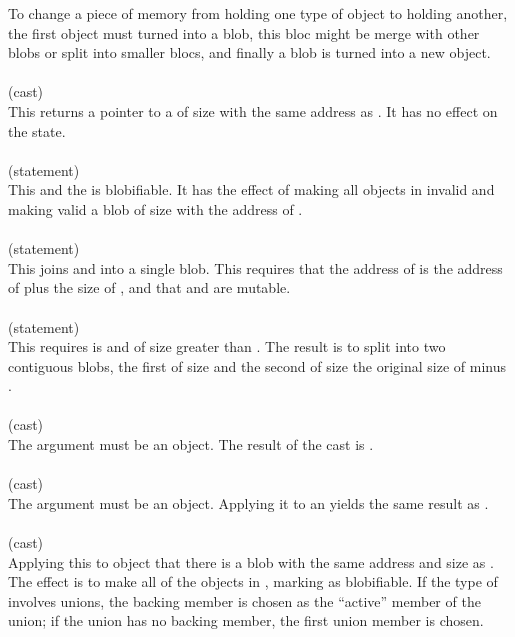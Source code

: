 \documentclass[preprint,nocopyrightspace]{sigplanconf}
\begin{document}
{{{{To change a piece of memory from holding one type of object to holding
another, the first object must turned into a blob, this bloc might be 
merge with other blobs or split into smaller blocs, and finally a blob
is turned into a new object. 
\\\\
 (cast)\\
This returns a pointer to a  of size  with the same
address as . It has no effect on the state. 
\\\\
 (statement)\\
This    and
the \vcc{\object} is blobifiable. It has the effect of making all
objects in  invalid and making valid a blob of
size  with the address of .
\\\\ 
 (statement)\\
This joins  and  into a single blob. This requires that
the address of  is the address of  plus the size
of , and that  and  are mutable.
\\\\
 (statement)\\
This requires  is \vcc{\mutable} and of size greater
than . The result is to split  into two contiguous
blobs, the first of size  and the second of size the original
size of  minus .
\\\\
 (cast) \\
The argument must be an object.
The result of the cast is .
\\\\
 (cast)\\
The argument must be an object.
Applying it to an  yields
the same result as .
\\\\
 (cast)\\
Applying this to object 
 that there is a \vcc{\wrapped} blob with the same
address and size as . The effect is to make all of the objects
in  \vcc{\mutable}, marking  as blobifiable. If
the type of  involves unions, the backing member is chosen as
the ``active'' member of the union; if the union has no backing
member, the first union member is chosen.

}}}}
\end{document}
